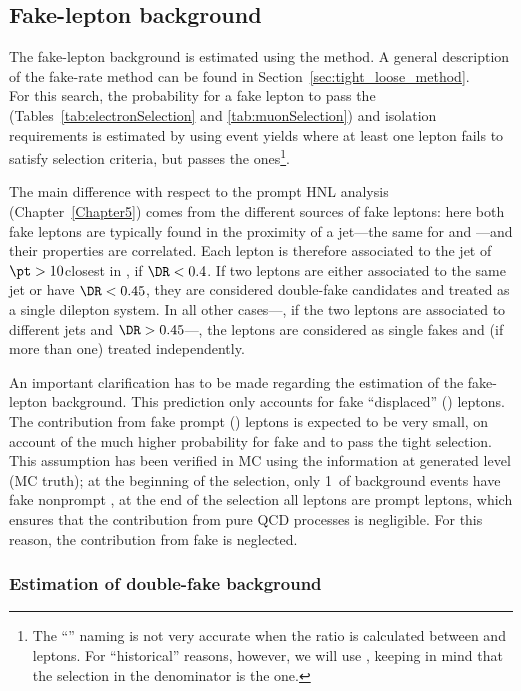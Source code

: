 \subsection{Fake-lepton background}\label{sec_llfakelepton}
The fake-lepton background is estimated using the \ttol
method.
A general description of the fake-rate method can be found in
Section~\ref{sec:tight_loose_method}.\\
For this search, the probability for 
a fake lepton to pass the \tD (Tables~\ref{tab:electronSelection} and \ref{tab:muonSelection}) and isolation requirements is estimated by using event yields where at least one lepton fails to satisfy \tD 
selection criteria, but passes the
\fo ones\footnote{The ``\ttol'' naming is not very accurate when the
  ratio is calculated between \tD and \fo leptons. For ``historical''
  reasons, however, we will use \ttol, keeping in mind that the selection in the
  denominator is the \fo one.}.

The main difference with respect to the prompt HNL analysis
(Chapter~\ref{Chapter5}) comes from the different sources of fake
leptons: here both fake leptons are typically found in the proximity of a
jet---the same for \ltwo and \lthree---and their
properties are correlated. Each \fo
lepton is therefore associated to the jet of $\pt>10$\GeV closest in
\DR, if $\DR<0.4$.
If two \fo leptons 
are either associated to the same jet or have $\DR<0.45$, they are considered double-fake
candidates and treated as a single dilepton system.
In all other cases---\ie, if the two \fo leptons are associated to
different jets and $\DR>0.45$---,
the \fo leptons are considered as single fakes and (if more than one)
treated independently.

An important clarification has to be made regarding the estimation of 
the fake-lepton background. This prediction only accounts for 
fake ``displaced''  (\ltwothree) leptons. The contribution from
fake prompt (\ie \lone) leptons is expected to be very small, on
account of the much higher probability for fake \ltwo and \lthree to
pass the tight \displ selection. This assumption has been verified in
MC using the information at generated level (MC truth); at the
beginning of the selection, only 1\textperthousand\ of background
events have fake nonprompt \lone, at the end of the selection all \lone
leptons are prompt leptons, which ensures that the contribution from
pure QCD processes is negligible. 
For this reason, the contribution from fake \lone is neglected.

\subsubsection{Estimation of double-fake background}
\label{sec:doubleFakeBkg}

